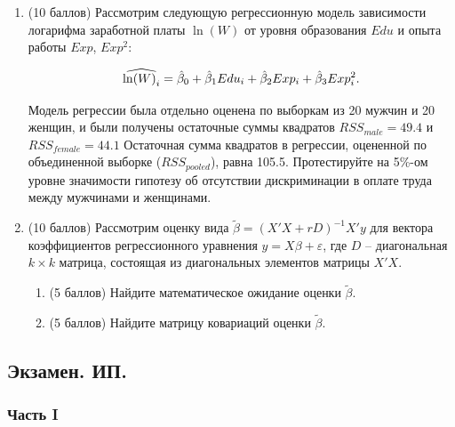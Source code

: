 \begin{enumerate}
\item (10 баллов) Рассмотрим следующую регрессионную модель зависимости логарифма заработной платы $\ln (W)$ от уровня образования $Edu$ и опыта работы $Exp$, $Exp^2$:
 
\[
\widehat{\ln (W)_i} = \hat{\beta}_0 + \hat{\beta}_1 Edu_i + \hat{\beta}_2 Exp_i + \hat{\beta}_3 Exp^2_i.
\]

Модель регрессии была отдельно оценена по выборкам из 20 мужчин и 20 женщин, и
были получены остаточные суммы квадратов $RSS_{male} = 49.4$ и $RSS_{female} = 44.1$ Остаточная сумма квадратов в регрессии, оцененной по объединенной выборке ($RSS_{pooled}$), равна 105.5. Протестируйте на 5\%-ом уровне значимости гипотезу об отсутствии дискриминации в оплате труда между мужчинами и женщинами.

\item (10 баллов) Рассмотрим оценку вида $\tilde\beta = (X'X+rD)^{-1}X'y$ для вектора коэффициентов регрессионного уравнения $y = X\beta + \varepsilon$, где $D$ – диагональная $k \times k$ матрица, состоящая из диагональных элементов матрицы $X'X$.

\begin{enumerate}
\item (5 баллов) Найдите математическое ожидание оценки $\tilde\beta$.
\item (5 баллов) Найдите матрицу ковариаций оценки $\tilde\beta$.
\end{enumerate}
\end{enumerate}

\subsection{Экзамен. ИП.}





\subsubsection*{Часть I}

